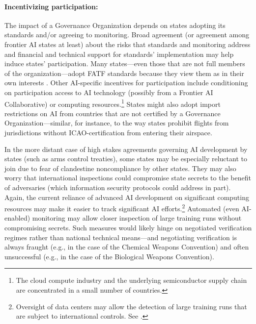 \documentclass[12pt]{article}
\begin{document}
\paragraph{Incentivizing participation:} The impact of a Governance
Organization depends on states adopting its standards and/or agreeing to
monitoring. Broad agreement (or agreement among frontier AI states at
least) about the risks that standards and monitoring address and
financial and technical support for standards' implementation may help
induce states' participation. Many states---even those that are not full
members of the organization---adopt FATF standards because they view
them as in their own interests \cite{noauthor_memorandum_2008}.
Other AI-specific incentives for
participation include conditioning on participation access to AI
technology (possibly from a Frontier AI Collaborative) or computing
resources.\footnote{The cloud compute industry and the underlying
  semiconductor supply chain are concentrated in a small number of
  countries.} States might also adopt import restrictions on AI from
countries that are not certified by a Governance Organization---similar,
for instance, to the way states prohibit flights from jurisdictions
without ICAO-certification from entering their airspace.

In the more distant case of high stakes agreements governing AI
development by states (such as arms control treaties), some states may
be especially reluctant to join due to fear of clandestine noncompliance
by other states. They may also worry that international inspections
could compromise state secrets to the benefit of adversaries (which
information security protocols could address in part). Again, the
current reliance of advanced AI development on significant computing
resources may make it easier to track significant AI efforts.\footnote{Oversight 
of data centers may allow the detection
  of large training runs that are subject to international controls. See \cite{shavit_what_2023, brundage_computing_nodate}.} Automated (even
AI-enabled) monitoring may allow closer inspection of large training
runs without compromising secrets. Such measures would likely hinge on
negotiated verification regimes rather than national technical
means---and negotiating verification is always fraught (e.g., in the
case of the Chemical Weapons Convention) and often unsuccessful (e.g.,
in the case of the Biological Weapons Convention)\cite{gallagher_politics_1999, jordan_international_nodate}.
\end{document}
